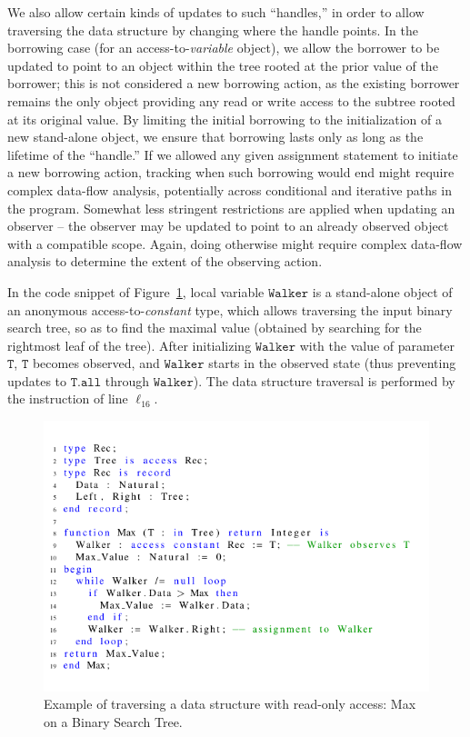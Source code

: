 \documentclass{llncs}
\newcommand\var[1]{\ensuremath{\mathtt{#1}}}
\begin{document}
We also allow certain kinds of updates to such ``handles,'' in order to allow traversing the data structure by changing where the handle points.
In the borrowing case (for an access-to-\textit{variable} object), we allow the borrower to be updated to point to an object within the tree rooted at the prior value of the borrower; this is not considered a new borrowing action, as the existing borrower remains the only object providing any read or write access to the subtree rooted at its original value.
By limiting the initial borrowing to the initialization of a new stand-alone object, we ensure that borrowing lasts only as long as the lifetime of the ``handle.''  If we allowed any given assignment statement to initiate a new borrowing action, tracking when such borrowing would end might require complex data-flow analysis, potentially across conditional and iterative paths in the program.  Somewhat less stringent restrictions are applied when updating an observer -- the observer may be updated to point to an already observed object with a compatible scope. Again, doing otherwise might require complex data-flow analysis to determine the extent of the observing action.

In the code snippet of Figure~\ref{fig:maxTree}, local variable \var{Walker} is a stand-alone object of an anonymous access-to-\textit{constant} type, which allows traversing the input binary
search tree, so as to find the maximal value (obtained by searching for the rightmost leaf of the tree). After initializing \var{Walker} with the value of parameter \var{T},
\var{T} becomes observed, and \var{Walker} starts in the observed state (thus preventing updates to \var{T.all} through \var{Walker}). The data structure traversal is performed by the instruction
of line $\ell_{16}$. 

\begin{figure}[htb!]
\centering
  \captionsetup{justification=centering,margin=0.6cm}
   \includegraphics[]{maxTree}
   \caption{Example of traversing a data structure with read-only access: Max on a Binary Search Tree.}
   \label{fig:maxTree} 
\end{figure}
\end{document}
